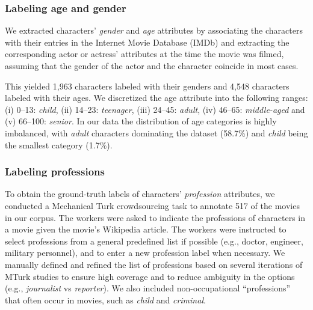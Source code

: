 
\subsubsection{Labeling age and gender} 

We extracted characters' \textit{gender} and \textit{age} attributes by associating the characters with their entries in the Internet Movie Database (IMDb) and extracting the corresponding actor or actress' attributes at the time the movie was filmed, assuming that the gender of the actor and the character coincide in most cases.

This yielded 1,963 characters labeled with their genders and 4,548 characters labeled with their ages.
We discretized the age attribute into the following ranges:
(i) 0--13: \textit{child}, (ii) 14--23: \textit{teenager}, (iii) 24--45: \textit{adult}, (iv) 46--65: \textit{middle-aged} and (v) 66--100: \textit{senior}.
In our data the distribution of age categories is highly imbalanced, with \textit{adult} characters dominating the dataset (58.7\%) and \textit{child} being the smallest category (1.7\%).

\subsubsection{Labeling professions} 
\label{kappa1}

To obtain the ground-truth labels of characters' \textit{profession} attributes, we conducted a Mechanical Turk crowdsourcing task to annotate 517 of the movies in our corpus.
The workers were asked to indicate the professions of characters in a movie given
the movie's Wikipedia article.
The workers were instructed to select professions from a general predefined list if possible (e.g., doctor, engineer, military personnel), and to enter a new profession label when necessary.
We manually defined and refined the list of professions based on several iterations of MTurk studies to ensure 
high coverage
and to reduce ambiguity in the options (e.g., \textit{journalist} vs \textit{reporter}).
We also included non-occupational ``professions'' that often occur in movies,
such as \textit{child} and \textit{criminal}.

